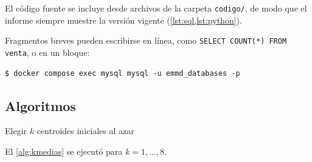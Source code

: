 El código fuente se incluye desde archivos de la carpeta \texttt{codigo/}, de modo que el
informe siempre muestre la versión vigente (\cref{lst:sql,lst:python}).





Fragmentos breves pueden escribirse en línea, como \lstinline[style=sql]|SELECT COUNT(*) FROM venta|,
o en un bloque:

\begin{lstlisting}[style=consola]
$ docker compose exec mysql mysql -u emmd_databases -p
\end{lstlisting}

\subsection{Algoritmos}

\begin{algorithm}[htbp]
  \caption{$k$-medias}
  \label{alg:kmedias}
  Elegir $k$ centroides iniciales al azar\;
\end{algorithm}

El \cref{alg:kmedias} se ejecutó para $k = 1, \dots, 8$.
